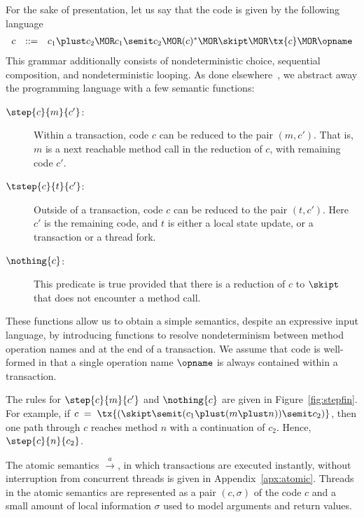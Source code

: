 For the sake of presentation, let us
say that the code is given by the following language 
\[ \begin{array}{rcl}
  c &::=& c_1\plust c_2 \MOR c_1 \semit c_2
      \MOR (c)^* \MOR \skipt \MOR \tx{c} \MOR \opname
\end{array} \]
This grammar additionally consists of nondeterministic choice, sequential
composition, and nondeterministic looping.
As done elsewhere~\cite{KP:PLDI15}, we abstract away the programming
language with a few semantic functions: 
%
\begin{description}
\item[$\step{c}{m}{c'}$:] Within a transaction, code $c$ can be reduced to the pair
  $(m,c')$.  That is, $m$ is a next reachable method call in the
  reduction of $c$, with remaining code $c'$.

\item[$\tstep{c}{t}{c'}$:] Outside of a transaction, code $c$ can be reduced to the pair
  $(t,c')$.  Here $c'$ is the remaining code, and $t$ is either
  a local state update, or a transaction or a thread fork.

\item[$\nothing{c}$:] This predicate is true provided that there is a
  reduction of $c$ to $\skipt$ that does not encounter a method call.
\end{description}
%
These functions allow us to obtain a simple semantics, despite an
expressive input language, by introducing functions to resolve
nondeterminism between method operation names and at the end of a
transaction.
%
We assume that code is well-formed in that a single operation name $\opname$ 
is always contained within a transaction. 


The rules for $\step{c}{m}{c'}$ and $\nothing{c}$ are given in
Figure~\ref{fig:stepfin}.
For example, if 
$
c \;=\; \tx{(\skipt \semit (c_1 \plust (m \plust n)) \semit c_2)}
$,
then one path through $c$ reaches method $n$ with a continuation of $c_2$. Hence,
$ \step{c}{n}{c_2}$.




The atomic semantics $\xrightarrow{a}$,
in which transactions are executed instantly, without interruption
from concurrent threads is given in Appendix~\ref{apx:atomic}.
Threads in the atomic semantics are represented as a pair
$(c,\sigma)$ of the code $c$ and a small amount of local
information $\sigma$ used to model arguments and return values.


